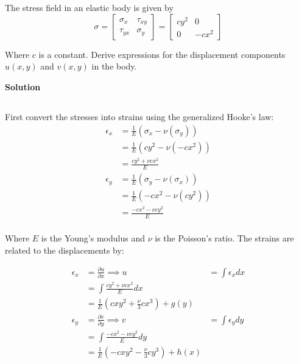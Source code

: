 \section{}

The stress field in an elastic body is given by
\[
\sigma =
\begin{bmatrix}
    \sigma_x & \tau_{xy} \\
    \tau_{yx} & \sigma_y
\end{bmatrix}
=
\begin{bmatrix}
    cy^2 & 0 \\
    0 & -cx^2
\end{bmatrix}
\]

Where $c$ is a constant. Derive expressions for the displacement components $u(x, y)$ and $v(x, y)$ in the body.

\textbf{Solution}
\subsection{}
First convert the stresses into strains using the generalized Hooke's law:
\[
\begin{aligned}
    \epsilon_x &= \frac{1}{E} (\sigma_x - \nu(\sigma_y)) \\
    &= \frac{1}{E} (cy^2 - \nu(-cx^2)) \\
    &= \frac{cy^2 + \nu cx^2}{E} \\
    \epsilon_y &= \frac{1}{E} (\sigma_y - \nu(\sigma_x)) \\
    &= \frac{1}{E} (-cx^2 - \nu(cy^2)) \\
    &= \frac{-cx^2 - \nu cy^2}{E} \\
\end{aligned}
\]

Where $E$ is the Young's modulus and $\nu$ is the Poisson's ratio. The strains are related to the displacements by:

\[
\begin{aligned}
    \epsilon_x &= \frac{\partial u}{\partial x}
    \implies u &= \int \epsilon_x dx \\
    &= \int \frac{cy^2 + \nu cx^2}{E} dx \\ 
    &= \boxed{\frac{1}{E} \left(cxy^2 + \frac{\nu}{3} cx^3\right) + g(y)} \\
    \epsilon_y &= \frac{\partial v}{\partial y}
    \implies v &= \int \epsilon_y dy \\
    &= \int \frac{-cx^2 - \nu cy^2}{E} dy \\
    &= \boxed{\frac{1}{E} \left(-cxy^2 - \frac{\nu}{3} cy^3\right) + h(x)} \\
\end{aligned}
\]